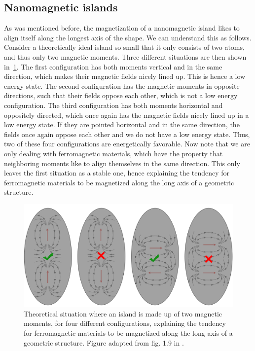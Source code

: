 \documentclass[10pt,a4paper]{article}
\begin{document}
\subsection{Nanomagnetic islands}
As was mentioned before, the magnetization of a nanomagnetic island likes to align itself along the longest axis of the shape. We can understand this as follows. Consider a theoretically ideal island so small that it only consists of two atoms, and thus only two magnetic moments. Three different situations are then shown in~\cref{fig:Intro_IslandEllipticPreferredDirection}.
The first configuration has both moments vertical and in the same direction, which makes their magnetic fields nicely lined up. This is hence a low energy state. The second configuration has the magnetic moments in opposite directions, such that their fields oppose each other, which is not a low energy configuration. The third configuration has both moments horizontal and oppositely directed, which once again has the magnetic fields nicely lined up in a low energy state. If they are pointed horizontal and in the same direction, the fields once again oppose each other and we do not have a low energy state. Thus, two of these four configurations are energetically favorable. Now note that we are only dealing with ferromagnetic materials, which have the property that neighboring moments like to align themselves in the same direction. This only leaves the first situation as a stable one, hence explaining the tendency for ferromagnetic materials to be magnetized along the long axis of a geometric structure.
\begin{figure}[t]
    \centering
    \includegraphics[width=0.9\columnwidth]{Figures/Introduction/NML_Carlton - Figure 1.9 adapted.png}
    \caption{Theoretical situation where an island is made up of two magnetic moments, for four different configurations, explaining the tendency for ferromagnetic materials to be magnetized along the long axis of a geometric structure. Figure adapted from fig. 1.9 in \cite{NML_Carlton}.}
    \label{fig:Intro_IslandEllipticPreferredDirection}
\end{figure}
\end{document}
